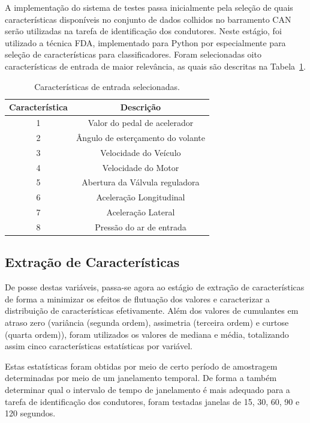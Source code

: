 A implementação do sistema de testes passa inicialmente pela seleção de quais características disponíveis no conjunto de dados colhidos no barramento CAN serão utilizadas na tarefa de identificação dos condutores. Neste estágio, foi utilizado a técnica FDA, implementado para Python por  especialmente para seleção de características para classificadores. Foram selecionadas oito características de entrada de maior relevância, as quais são descritas na Tabela~\ref{tab:var}.

\begin{table}[h]
	\centering
	\caption{Características de entrada selecionadas.}
	\label{tab:var}
	\begin{tabular}{cc}
		\hline
		Característica & Descrição \\ \hline
		1 & Valor do pedal de acelerador \\
		2 & Ângulo de esterçamento do volante \\
		3 & Velocidade do Veículo \\
		4 & Velocidade do Motor \\
		5 & Abertura da Válvula reguladora \\
		6 & Aceleração Longitudinal \\
		7 & Aceleração Lateral \\
		8 & Pressão do ar de entrada \\ \hline
	\end{tabular}
\end{table}

\subsection{Extração de Características}

De posse destas variáveis, passa-se agora ao estágio de extração de características de forma a minimizar os efeitos de flutuação dos valores e caracterizar a distribuição de características efetivamente. Além dos valores de cumulantes em atraso zero (variância (segunda ordem), assimetria (terceira ordem) e curtose (quarta ordem)), foram utilizados os valores de mediana e média, totalizando assim cinco características estatísticas por variável.

Estas estatísticas foram obtidas por meio de certo período de amostragem determinadas por meio de um janelamento temporal. De forma a também determinar qual o intervalo de tempo de janelamento é mais adequado para a tarefa de identificação dos condutores, foram testadas janelas de 15, 30, 60, 90 e 120 segundos. 

